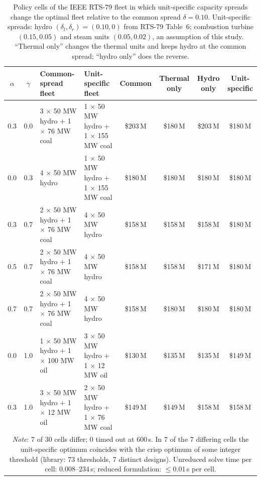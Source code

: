 \begin{table}[!htbp]
\providecommand{\revtablecolor}{}\revtablecolor
\centering
\caption{Policy cells of the IEEE RTS-79 fleet in which unit-specific capacity spreads change the optimal fleet relative to the common spread $\delta=0.10$. Unit-specific spreads: hydro $(\delta_l,\delta_r)=(0.10,0)$ from RTS-79 Table~6; combustion turbine $(0.15,0.05)$ and steam units $(0.05,0.02)$, an assumption of this study. ``Thermal only'' changes the thermal units and keeps hydro at the common spread; ``hydro only'' does the reverse.}
\label{tab:rts_unit_specific}
\footnotesize
\begin{tabular}{ccp{3.0cm}p{3.0cm}cccc}
\hline
$\alpha$ & $\gamma$ & Common-spread fleet & Unit-specific fleet & Common & Thermal only & Hydro only & Unit-specific\\
\hline
0.3 & 0.0 & 3 $\times$ 50 MW hydro + 1 $\times$ 76 MW coal & 1 $\times$ 50 MW hydro + 1 $\times$ 155 MW coal & \$203\,M & \$180\,M & \$203\,M & \$180\,M\\
0.0 & 0.3 & 4 $\times$ 50 MW hydro & 1 $\times$ 50 MW hydro + 1 $\times$ 155 MW coal & \$180\,M & \$180\,M & \$180\,M & \$180\,M\\
0.3 & 0.7 & 2 $\times$ 50 MW hydro + 1 $\times$ 76 MW coal & 4 $\times$ 50 MW hydro & \$158\,M & \$158\,M & \$158\,M & \$180\,M\\
0.5 & 0.7 & 2 $\times$ 50 MW hydro + 1 $\times$ 76 MW coal & 4 $\times$ 50 MW hydro & \$158\,M & \$158\,M & \$171\,M & \$180\,M\\
0.7 & 0.7 & 2 $\times$ 50 MW hydro + 1 $\times$ 76 MW coal & 4 $\times$ 50 MW hydro & \$158\,M & \$180\,M & \$180\,M & \$180\,M\\
0.0 & 1.0 & 1 $\times$ 50 MW hydro + 1 $\times$ 100 MW oil & 3 $\times$ 50 MW hydro + 1 $\times$ 12 MW oil & \$130\,M & \$135\,M & \$135\,M & \$149\,M\\
0.3 & 1.0 & 3 $\times$ 50 MW hydro + 1 $\times$ 12 MW oil & 2 $\times$ 50 MW hydro + 1 $\times$ 76 MW coal & \$149\,M & \$149\,M & \$158\,M & \$158\,M\\
\hline
\multicolumn{8}{p{\dimexpr\linewidth-2\tabcolsep\relax}}{\textit{Note}: 7 of 30 cells differ; 0 timed out at 600\,s. In 7 of the 7 differing cells the unit-specific optimum coincides with the crisp optimum of some integer threshold (library: 73 thresholds, 7 distinct designs). Unreduced solve time per cell: $0.008$--$234$\,s; reduced formulation: $\le 0.01$\,s per cell.}\\
\hline
\end{tabular}
\end{table}
